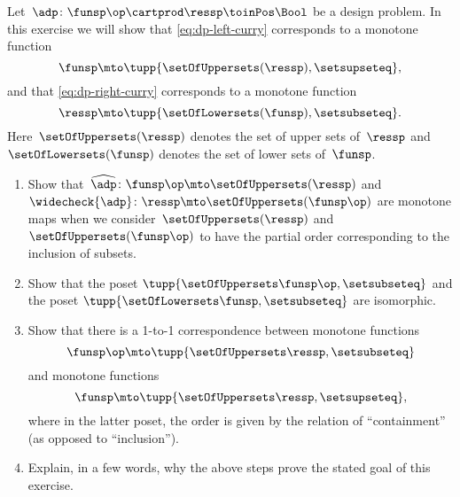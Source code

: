 \begin{gradedexercise}
    \label{ex:CurryingDesignProblems}
    Let~$\adp\colon \funsp\op \cartprod \ressp\toinPos \Bool$ be a design problem.
    In this exercise we will show that \cref{eq:dp-left-curry} corresponds to a monotone function
    \begin{equation}
        \funsp \mto \tupp{\setOfUppersets (\ressp), \setsupseteq},
    \end{equation}
    and that \cref{eq:dp-right-curry} corresponds to a monotone function
    \begin{equation}
        \ressp \mto \tupp{\setOfLowersets(\funsp), \setsubseteq}.
    \end{equation}
    Here~$\setOfUppersets (\ressp)$ denotes the set of upper sets of~$\ressp$ and~$\setOfLowersets(\funsp)$ denotes the set of lower sets of~$\funsp$.

    \begin{enumerate}
        \item Show that~$\widehat{\adp} \colon \funsp\op \mto \setOfUppersets (\ressp)$ and~$\widecheck{\adp} \colon \ressp \mto \setOfUppersets (\funsp\op)$ are monotone maps when we consider~$\setOfUppersets (\ressp)$ and~$\setOfUppersets (\funsp\op)$ to have the partial order corresponding to the inclusion of subsets.
        \item Show that the poset $\tupp{\setOfUppersets\funsp\op, \setsubseteq}$ and the poset $\tupp{\setOfLowersets\funsp, \setsubseteq}$ are isomorphic.
        \item Show that there is a 1-to-1 correspondence between monotone functions
              \begin{equation}
                  \funsp\op \mto \tupp{\setOfUppersets \ressp, \setsubseteq}
              \end{equation}
              and monotone functions
              \begin{equation}
                  \funsp \mto \tupp{\setOfUppersets \ressp, \setsupseteq},
              \end{equation}
              where in the latter poset, the order is given by the relation of ``containment'' (as opposed to ``inclusion'').
        \item Explain, in a few words, why the above steps prove the stated goal of this exercise.
    \end{enumerate}
\end{gradedexercise}


